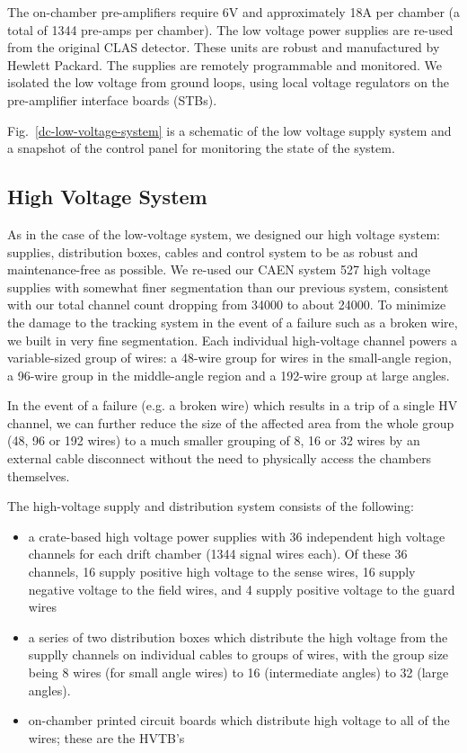 The on-chamber pre-amplifiers require 6V and approximately 18A per chamber
(a total of 1344 pre-amps per chamber).
The low voltage power supplies are re-used from the original CLAS detector.  
These units are robust and manufactured by Hewlett Packard.  
The supplies are remotely programmable and monitored.   We 
isolated the low voltage from 
ground loops, using local voltage regulators on the pre-amplifier interface 
boards (STBs).  

Fig.~\ref{dc-low-voltage-system} is a schematic of the low voltage
supply system and a snapshot 
of the control panel for monitoring the state of the system.

\subsection{High Voltage System}

As in the case of the low-voltage system, we designed our high voltage system: 
supplies, distribution boxes, cables and control system to be as robust and 
maintenance-free as possible.  
We re-used our CAEN 
system 527 high voltage supplies with somewhat finer segmentation than our 
previous system, consistent with our total channel count dropping from 34000 
to about 24000.
To minimize the damage to the tracking system in the event of a failure such as
a broken wire, we built in very fine segmentation.
Each individual high-voltage channel powers a variable-sized group of 
wires: a 48-wire group for wires in the small-angle region, a 96-wire group
in the middle-angle region and a 192-wire group at large angles.

In the event of a failure (e.g. a broken wire) which results in a trip
of a single HV channel, we can further reduce the size of the affected
area from the whole group (48, 96 or 192 wires) to a much smaller grouping
of 8, 16 or 32 wires by an external cable disconnect without the need to 
physically access the chambers themselves.

The high-voltage supply and distribution system consists of the following:
\begin{itemize}
\item a crate-based high voltage power supplies with 36 independent
high voltage channels for each drift chamber (1344 signal wires each).
Of these 36 channels, 16 supply positive high voltage to the sense
wires, 16 supply negative voltage to the field wires, and 4 supply
positive voltage to the guard wires
\item a series of two distribution boxes which distribute the high
voltage from the supplly channels on individual cables to groups
of wires, with the group size being 8 wires (for small angle wires)
to 16 (intermediate angles) to 32 (large angles). 
\item  on-chamber printed circuit boards which distribute high voltage
to all of the wires; these are the HVTB's
\end{itemize}



